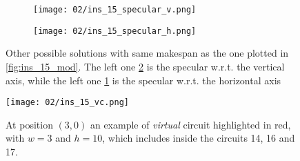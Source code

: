         \begin{figure}[H]
            \centering
            \begin{subfigure}[b]{0.45\textwidth}
                \centering
                \texttt{[image: 02/ins\_15\_specular\_v.png]}
                \caption{}
                \label{fig:ins_15_specular_v}
            \end{subfigure}
            \hfill
            \begin{subfigure}[b]{0.45\textwidth}
                \centering 
                \texttt{[image: 02/ins\_15\_specular\_h.png]}
                \caption{}
                \label{fig:ins_15_specular_h}
            \end{subfigure}
            \hfill
            \caption{
                Other possible solutions with same makespan as the one plotted in \ref{fig:ins_15_mod}.
                The left one \ref{fig:ins_15_specular_h} is the specular w.r.t. the vertical axis,
                while the left one \ref{fig:ins_15_specular_v} is the specular w.r.t. the horizontal axis
            }
            \label{fig:symmetry_specular}
        \end{figure}

        \begin{figure}[H]
            \centering
            \texttt{[image: 02/ins\_15\_vc.png]}
            \caption{
                At position $(3,0)$ an example of \textit{virtual} circuit highlighted in red,
                with $w = 3$ and $h = 10$, which includes inside the circuits 14, 16 and 17.
            }
            \label{fig:virtual circuit}
        \end{figure}

